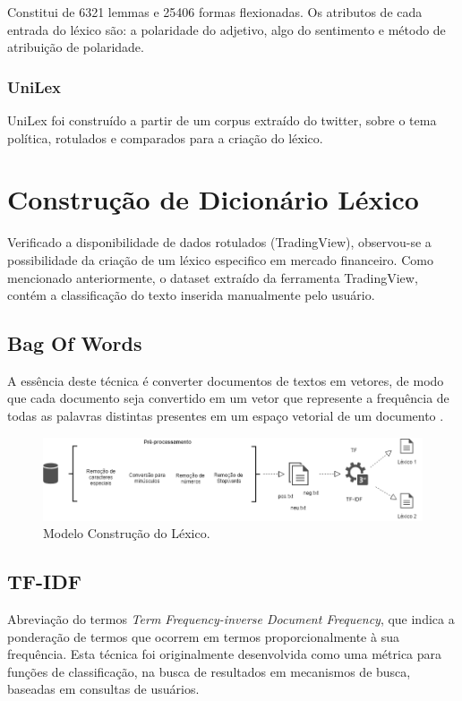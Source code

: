 \documentclass[conference]{IEEEtran}
\begin{document}
Constitui de 6321 lemmas e 25406 formas flexionadas. Os atributos de cada entrada do léxico são: a polaridade do adjetivo, algo do sentimento e método de atribuição de polaridade. 

\subsubsection{UniLex}

UniLex foi construído a partir de um corpus extraído do twitter, sobre o tema política, rotulados e comparados para a criação do léxico. 

\section{Construção de Dicionário Léxico}

Verificado a disponibilidade de dados rotulados (TradingView), observou-se a possibilidade da criação de um léxico especifico em mercado financeiro. Como mencionado anteriormente, o dataset extraído da ferramenta TradingView, contém a classificação do texto inserida manualmente pelo usuário. 

\subsection{Bag Of Words}

A essência deste técnica é converter documentos de textos em vetores, de modo que cada documento seja convertido em um vetor que represente a frequência de todas as palavras distintas presentes em um espaço vetorial de um documento \cite{Dipanjan:2016}.  

\begin{figure}[h]
\begin{center}
\includegraphics[width=0.6\linewidth]{Lexicon.png}
\end{center}
   \caption{Modelo Construção do Léxico.}
\label{fig:lex}
\end{figure}

\subsection{TF-IDF}

Abreviação do termos \textit{Term Frequency-inverse Document Frequency}, que indica a ponderação de termos que ocorrem em termos proporcionalmente à sua frequência. Esta técnica foi originalmente desenvolvida como uma métrica para funções de classificação, na busca de resultados em mecanismos de busca, baseadas em consultas de usuários. 
\end{document}
